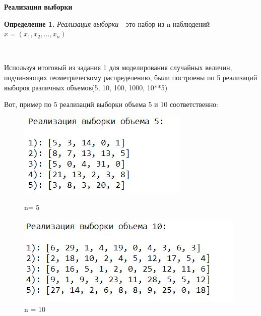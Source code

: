 \documentclass[a4paper,12pt, oneside]{book}
\begin{document}
\vspace{5mm}
	\large{\textbf{Реализация выборки}}
\vspace{5mm}

\normalsize{\textbf{Определение 1.}} \textit{Реализация выборки - }это набор из n наблюдений $\hat{x} = (x_1, x_2, \ldots, x_n)$

\vspace{5mm}
\\
\vspace{5mm}

Используя итоговый из задания 1 для моделирования случайных величин, подчиняющих геометрическому распределению, были построены по 5 реализаций выборок различных объемов(5, 10, 100, 1000, 10**5)
\vspace{5mm}

Вот, пример по  5 реализаций выборки объема 5 и  10 соответственно:

\begin{figure}[h]
	\begin{center}
		\begin{minipage}[h]{0.4\linewidth}
			\includegraphics[width=1\linewidth]{vibor_5.jpg}
			\caption{n= 5} %
			\label{ris:experimoriginal} %
		\end{minipage}
		\hfill
		\begin{minipage}[h]{0.4\linewidth}
			\includegraphics[width=1\linewidth]{vibor_10.jpg}
			\caption{n = 10}
			\label{ris:experimcoded}
		\end{minipage}
	\end{center}
\end{figure}
\end{document}
